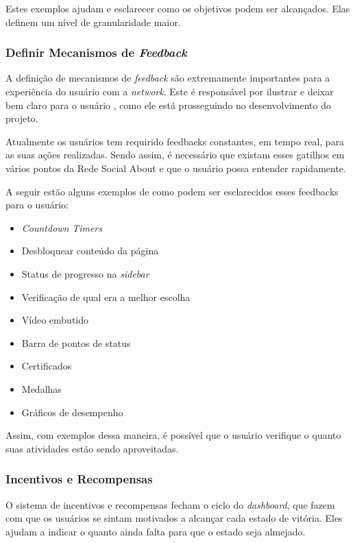 Estes exemplos ajudam e esclarecer como os objetivos podem ser alcançados. Elas
definem um nível de
granularidade maior.

\subsubsection{Definir Mecanismos de \textit{Feedback}}
\label{sub:define_feedback_mechanics}
A definição de mecanismos de \textit{feedback} são extremamente importantes para a experiência do usuário
com a \textit{network}. Este é responsável por ilustrar e deixar bem claro para o usuário
, como ele está
prosseguindo no desenvolvimento do projeto.

Atualmente os usuários tem requirido feedbacks constantes, em tempo real, para as suas ações
realizadas. Sendo assim, é necessário que existam esses gatilhos em vários pontos da
Rede Social About e que o usuário possa entender rapidamente.

A seguir estão alguns exemplos de como podem ser esclarecidos esses feedbacks para o usuário:

\begin{itemize}
    \item \textit{Countdown} \textit{Timers}
    \item Desbloquear conteúdo da página
    \item Status de progresso na \textit{sidebar}
    \item Verificação de qual era a melhor escolha
    \item Vídeo embutido
    \item Barra de pontos de status
    \item Certificados
    \item Medalhas
    \item Gráficos de desempenho
\end{itemize}

Assim, com exemplos dessa maneira, é possível que o usuário verifique o quanto suas atividades estão
sendo aproveitadas.

\subsubsection{Incentivos e Recompensas}
\label{sub:incentives_and_rewards}
O sistema de incentivos e recompensas fecham o ciclo do \textit{dashboard}, que fazem com que
os usuários se sintam motivados a alcançar cada estado de vitória. Eles ajudam a
indicar
o quanto ainda falta para que o estado seja almejado.

